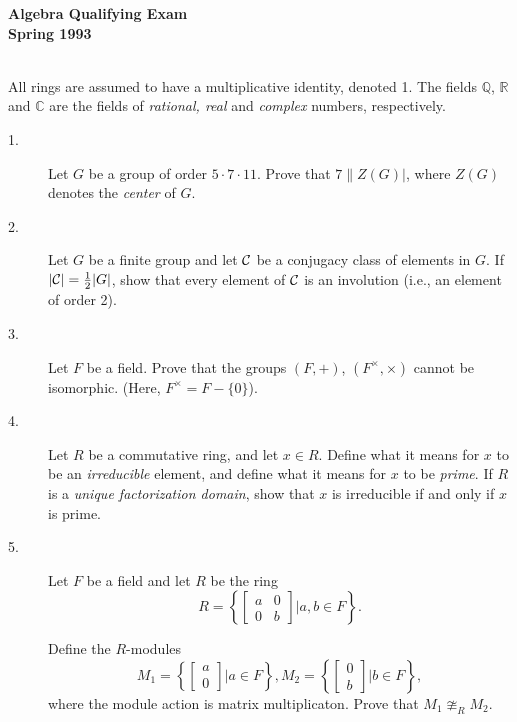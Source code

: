 \documentclass{article}
\def\R{\mathbb R}
\def\C{\mathbb C}
\def\Q{\mathbb Q}
\begin{document}




\begin{center}\begin{LARGE}
{\bf Algebra Qualifying Exam}\\ 
{\bf Spring 1993}\\ \end{LARGE}
\end{center}
\vspace{0.1in}
\noindent\hrulefill\\

All rings are assumed to have a multiplicative identity, denoted 1. The
fields $\Q$, $\R$ and $\C$ are the fields of {\it rational, real} and
{\it complex} numbers, respectively.

\begin{description}

\item[1.]
Let $G$ be a group of order $5 \cdot 7 \cdot 11$. Prove that
$7 \parallel Z(G)|$, where $Z(G)$ denotes the {\it center} of $G$.

\item[2.]
Let $G$ be a finite group and let $\cal C$ be a conjugacy class of elements
in $G$. If $|{\cal C}| = \frac{1}{2} |G|$, show that every element of
${\cal C}$ is an involution (i.e., an element of order 2).

\item[3.]
Let $F$ be a field. Prove that the groups $(F, +)$, $(F^\times, \times)$
cannot be isomorphic. (Here, $F^\times = F - \{0\}$).

\item[4.]
Let $R$ be a commutative ring, and let $x \in R$. Define what it means for
$x$ to be an {\it irreducible} element, and define what it means for $x$
to be {\it prime}. If $R$ is a {\it unique factorization domain}, show that
$x$ is irreducible if and only if $x$ is prime.

\item[5.]
Let $F$ be a field and let $R$ be the ring
$$R = \left\{ \begin{bmatrix} a&0 \\ 0&b \end{bmatrix}
  | a,b \in F \right\}.$$

Define the $R$-modules
$$M_1 = \left\{ \begin{bmatrix} a \\ 0 \end{bmatrix}
  | a \in F \right\}, M_2 = \left\{ \begin{bmatrix} 0 \\b \end{bmatrix}
  | b \in F \right\},$$
where the module action is matrix multiplicaton. Prove that
$M_1 \ncong_R M_2$.


\end{description}
\end{document}
